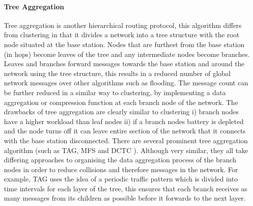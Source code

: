 \paragraph{Tree Aggregation} Tree aggregation is another hierarchical routing protocol, this algorithm differs from clustering in that it divides a network into a tree structure with the root node situated at the base station. Nodes that are furthest from the base station (in hops) become leaves of the tree and any intermediate nodes become branches. Leaves and branches forward messages towards the base station and around the network using the tree structure, this results in a reduced number of global network messages over other algorithms such as flooding. The message count can be further reduced in a similar way to clustering, by implementing a data aggregation or compression function at each branch node of the network. The drawbacks of tree aggregation are clearly similar to clustering i) branch nodes have a higher workload than leaf nodes ii) if a branch nodes battery is depleted and the node turns off it can leave entire section of the network that it connects with the base station disconnected. There are several prominent tree aggregation algorithm (such as TAG, MFS and DCTC \cite{1628365}). Although very similar, they all take differing approaches to organising the data aggregation process of the branch nodes in order to reduce collisions and therefore messages in the network. For example, TAG uses the idea of a periodic traffic pattern which is divided into time intervals for each layer of the tree, this ensures that each branch receives as many messages from its children as possible before it forwards to the next layer.   

